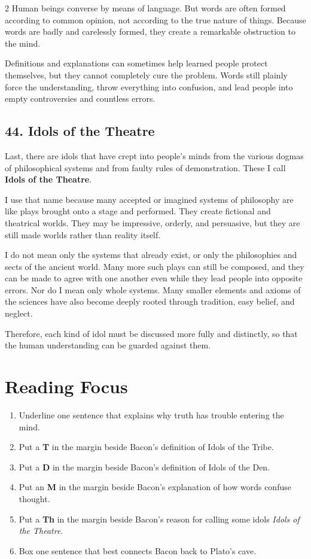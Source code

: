 \documentclass[12pt]{article}
\begin{document}
\begin{multicols}{2}
Human beings converse by means of language. But words are often formed according to common opinion, not according to the true nature of things. Because words are badly and carelessly formed, they create a remarkable obstruction to the mind.

Definitions and explanations can sometimes help learned people protect themselves, but they cannot completely cure the problem. Words still plainly force the understanding, throw everything into confusion, and lead people into empty controversies and countless errors.

\subsection*{44. Idols of the Theatre}
Last, there are idols that have crept into people's minds from the various dogmas of philosophical systems and from faulty rules of demonstration. These I call \textbf{Idols of the Theatre}.

I use that name because many accepted or imagined systems of philosophy are like plays brought onto a stage and performed. They create fictional and theatrical worlds. They may be impressive, orderly, and persuasive, but they are still made worlds rather than reality itself.

I do not mean only the systems that already exist, or only the philosophies and sects of the ancient world. Many more such plays can still be composed, and they can be made to agree with one another even while they lead people into opposite errors. Nor do I mean only whole systems. Many smaller elements and axioms of the sciences have also become deeply rooted through tradition, easy belief, and neglect.

Therefore, each kind of idol must be discussed more fully and distinctly, so that the human understanding can be guarded against them.

\section*{Reading Focus}
\begin{enumerate}[leftmargin=*, itemsep=0.2em]
\item Underline one sentence that explains why truth has trouble entering the mind.
\item Put a \textbf{T} in the margin beside Bacon's definition of Idols of the Tribe.
\item Put a \textbf{D} in the margin beside Bacon's definition of Idols of the Den.
\item Put an \textbf{M} in the margin beside Bacon's explanation of how words confuse thought.
\item Put a \textbf{Th} in the margin beside Bacon's reason for calling some idols \textit{Idols of the Theatre}.
\item Box one sentence that best connects Bacon back to Plato's cave.
\end{enumerate}


\end{multicols}
\end{document}
